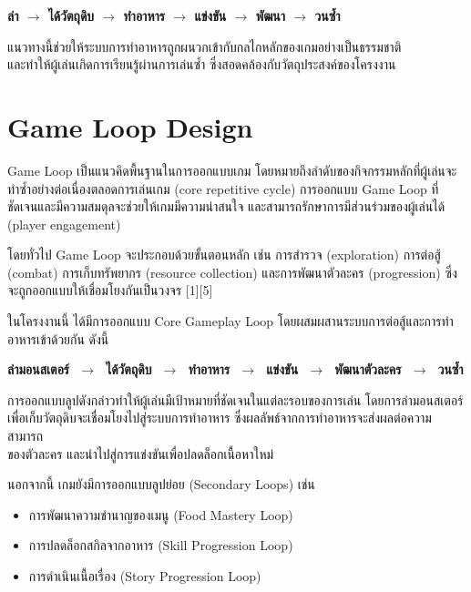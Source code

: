 \begin{center}
  \textbf{ล่า $\rightarrow$ ได้วัตถุดิบ $\rightarrow$ ทำอาหาร $\rightarrow$ แข่งขัน $\rightarrow$ พัฒนา $\rightarrow$ วนซ้ำ}
\end{center}

แนวทางนี้ช่วยให้ระบบการทำอาหารถูกผนวกเข้ากับกลไกหลักของเกมอย่างเป็นธรรมชาติ \\และทำให้ผู้เล่นเกิดการเรียนรู้ผ่านการเล่นซ้ำ ซึ่งสอดคล้องกับวัตถุประสงค์ของโครงงาน

\newpage
\section{Game Loop Design}
\hspace{1.5em}Game Loop เป็นแนวคิดพื้นฐานในการออกแบบเกม โดยหมายถึงลำดับของกิจกรรมหลักที่ผู้เล่นจะทำซ้ำอย่างต่อเนื่องตลอดการเล่นเกม (core repetitive cycle) การออกแบบ Game Loop ที่ชัดเจนและมีความสมดุลจะช่วยให้เกมมีความน่าสนใจ และสามารถรักษาการมีส่วนร่วมของผู้เล่นได้ (player engagement)

โดยทั่วไป Game Loop จะประกอบด้วยขั้นตอนหลัก เช่น การสำรวจ (exploration) การต่อสู้ \\(combat) การเก็บทรัพยากร (resource collection) และการพัฒนาตัวละคร (progression) ซึ่งจะถูกออกแบบให้เชื่อมโยงกันเป็นวงจร [1][5]

ในโครงงานนี้ ได้มีการออกแบบ Core Gameplay Loop โดยผสมผสานระบบการต่อสู้และการทำอาหารเข้าด้วยกัน ดังนี้

\begin{center}
\textbf{ล่ามอนสเตอร์ $\;\rightarrow\;$ ได้วัตถุดิบ $\;\rightarrow\;$ ทำอาหาร $\;\rightarrow\;$ แข่งขัน $\;\rightarrow\;$ พัฒนาตัวละคร $\;\rightarrow\;$ วนซ้ำ}
\end{center}

การออกแบบลูปดังกล่าวทำให้ผู้เล่นมีเป้าหมายที่ชัดเจนในแต่ละรอบของการเล่น โดยการล่ามอนสเตอร์เพื่อเก็บวัตถุดิบจะเชื่อมโยงไปสู่ระบบการทำอาหาร ซึ่งผลลัพธ์จากการทำอาหารจะส่งผลต่อความสามารถ\\ของตัวละคร และนำไปสู่การแข่งขันเพื่อปลดล็อกเนื้อหาใหม่

นอกจากนี้ เกมยังมีการออกแบบลูปย่อย (Secondary Loops) เช่น
\begin{itemize}
  \item การพัฒนาความชำนาญของเมนู (Food Mastery Loop)
  \item การปลดล็อกสกิลจากอาหาร (Skill Progression Loop)
  \item การดำเนินเนื้อเรื่อง (Story Progression Loop)
\end{itemize}

